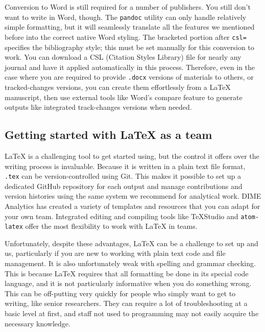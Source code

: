 
\noindent Conversion to Word is still required for a number of publishers.
You still don't want to write in Word, though.
The \texttt{pandoc} utility can only handle relatively simple formatting,
but it will seamlessly translate all the features we mentioned before
into the correct native Word styling.
The bracketed portion after \texttt{csl=} specifies the bibliography style;
this must be set manually for this conversion to work.
You can download a CSL (Citation Styles Library) file
for nearly any journal and have it applied automatically in this process.
Therefore, even in the case where you are required to provide
\texttt{.docx} versions of materials to others, or tracked-changes versions,
you can create them effortlessly from a {\LaTeX} manuscript,
then use external tools like Word's compare feature
to generate outputs like integrated track-changes versions when needed.


\subsection{Getting started with {\LaTeX} as a team}

{\LaTeX} is a challenging tool to get started using,
but the control it offers over the writing process is invaluable.
Because it is written in a plain text file format,
\texttt{.tex} can be version-controlled using Git.
This makes it possible to set up a dedicated GitHub repository for each output
and manage contributions and version histories
using the same system we recommend for analytical work.
DIME Analytics has created a variety of templates and resources
that you can adapt for your own team.
Integrated editing and compiling tools like TeXStudio
and \texttt{atom-latex}
offer the most flexibility to work with {\LaTeX} in teams.

Unfortunately, despite these advantages, {\LaTeX} can be a challenge to set up and us,
particularly if you are new to working with plain text code and file management.
It is also unfortunately weak with spelling and grammar checking.
This is because {\LaTeX} requires that all formatting be done in its special code language,
and it is not particularly informative when you do something wrong.
This can be off-putting very quickly for people
who simply want to get to writing, like senior researchers.
They can require a lot of troubleshooting at a basic level at first,
and staff not used to programming may not easily acquire the necessary knowledge.

